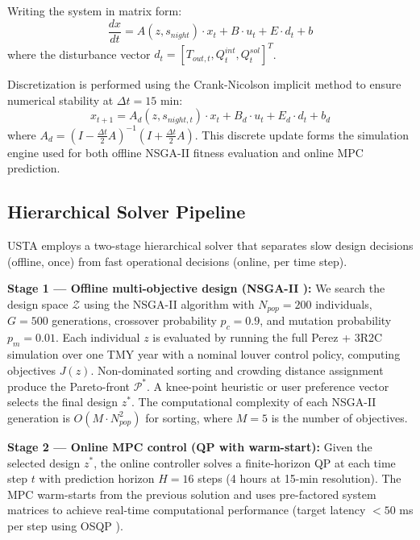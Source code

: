 \documentclass[5p,times,twocolumn]{elsarticle}
\begin{document}
Writing the system in matrix form:
\begin{equation}
\label{eq:matrix}
\frac{dx}{dt} = A(z, s_{night}) \cdot x_t + B \cdot u_t + E \cdot d_t + b
\end{equation}
where the disturbance vector $d_t = [T_{out,t}, Q^{int}_t, Q^{sol}_t]^T$.

Discretization is performed using the Crank-Nicolson implicit method to ensure numerical stability at $\Delta t = 15$ min:
\begin{equation}
\label{eq:discrete}
x_{t+1} = A_d(z, s_{night,t}) \cdot x_t + B_d \cdot u_t + E_d \cdot d_t + b_d
\end{equation}
where $A_d = (I - \frac{\Delta t}{2} A)^{-1}(I + \frac{\Delta t}{2} A)$. This discrete update forms the simulation engine used for both offline NSGA-II fitness evaluation and online MPC prediction.

\subsection{Hierarchical Solver Pipeline}

USTA employs a two-stage hierarchical solver that separates slow design decisions (offline, once) from fast operational decisions (online, per time step).

\textbf{Stage 1 --- Offline multi-objective design (NSGA-II \cite{deb2002}):} We search the design space $\mathcal{Z}$ using the NSGA-II algorithm with $N_{pop} = 200$ individuals, $G = 500$ generations, crossover probability $p_c = 0.9$, and mutation probability $p_m = 0.01$. Each individual $z$ is evaluated by running the full Perez + 3R2C simulation over one TMY year with a nominal louver control policy, computing objectives $J(z)$. Non-dominated sorting and crowding distance assignment produce the Pareto-front $\mathcal{P}^*$. A knee-point heuristic or user preference vector selects the final design $z^*$. The computational complexity of each NSGA-II generation is $O(M \cdot N_{pop}^2)$ for sorting, where $M = 5$ is the number of objectives.

\textbf{Stage 2 --- Online MPC control (QP with warm-start):} Given the selected design $z^*$, the online controller solves a finite-horizon QP at each time step $t$ with prediction horizon $H = 16$ steps (4 hours at 15-min resolution). The MPC warm-starts from the previous solution and uses pre-factored system matrices to achieve real-time computational performance (target latency $< 50$ ms per step using OSQP \cite{stellato2020}).
\end{document}
